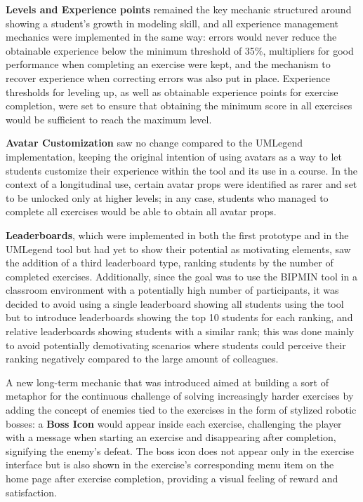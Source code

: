 \textbf{Levels and Experience points} remained the key mechanic structured around showing a student's growth in modeling skill, and all experience management mechanics were implemented in the same way: errors would never reduce the obtainable experience below the minimum threshold of 35\%, multipliers for good performance when completing an exercise were kept, and the mechanism to recover experience when correcting errors was also put in place. Experience thresholds for leveling up, as well as obtainable experience points for exercise completion, were set to ensure that obtaining the minimum score in all exercises would be sufficient to reach the maximum level.  

\textbf{Avatar Customization} saw no change compared to the UMLegend implementation, keeping the original intention of using avatars as a way to let students customize their experience within the tool and its use in a course. In the context of a longitudinal use, certain avatar props were identified as rarer and set to be unlocked only at higher levels; in any case, students who managed to complete all exercises would be able to obtain all avatar props.

\textbf{Leaderboards}, which were implemented in both the first prototype and in the UMLegend tool but had yet to show their potential as motivating elements, saw the addition of a third leaderboard type, ranking students by the number of completed exercises. Additionally, since the goal was to use the BIPMIN tool in a classroom environment with a potentially high number of participants, it was decided to avoid using a single leaderboard showing all students using the tool but to introduce leaderboards showing the top 10 students for each ranking, and relative leaderboards showing students with a similar rank; this was done mainly to avoid potentially demotivating scenarios where students could perceive their ranking negatively compared to the large amount of colleagues.

A new long-term mechanic that was introduced aimed at building a sort of metaphor for the continuous challenge of solving increasingly harder exercises by adding the concept of enemies tied to the exercises in the form of stylized robotic bosses: a \textbf{Boss Icon} would appear inside each exercise, challenging the player with a message when starting an exercise and disappearing after completion, signifying the enemy's defeat. The boss icon does not appear only in the exercise interface but is also shown in the exercise's corresponding menu item on the home page after exercise completion, providing a visual feeling of reward and satisfaction.

